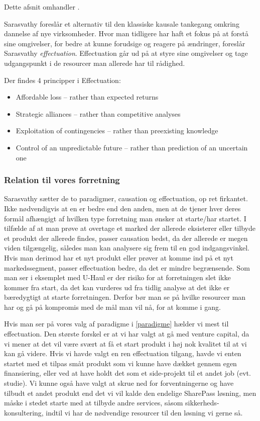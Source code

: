 
Dette afsnit omhandler \citet{sarasvathy2001effectuation}.

Sarasvathy foreslår et alternativ til den klassiske kausale tankegang omkring dannelse af nye virksomheder.
Hvor man tidligere har haft et fokus på at forstå sine omgivelser, for bedre at kunne forudsige og reagere på ændringer, foreslår Sarasvathy \textit{effectuation}.
Effectuation går ud på at styre sine omgivelser og tage udgangspunkt i de resourcer man allerede har til rådighed.

Der findes 4 principper i Effectuation:
\begin{itemize}
  \item Affordable loss -- rather than expected returns
  \item Strategic alliances -- rather than competitive analyses
  \item Exploitation of contingencies -- rather than preexisting knowledge
  \item Control of an unpredictable future -- rather than prediction of an uncertain one
\end{itemize}

\subsubsection{Relation til vores forretning}
Sarasvathy sætter de to paradigmer, causation og effectuation, op ret firkantet.
Ikke nødvendigvis at en er bedre end den anden, men at de tjener hver deres formål afhængigt af hvilken type forretning man ønsker at starte/har startet.
I tilfælde af at man prøve at overtage et marked der allerede eksisterer eller tilbyde et produkt der allerede findes, passer causation bedst, da der allerede er megen viden tilgængelig, således man kan analysere sig frem til en god indgangsvinkel.
Hvis man derimod har et nyt produkt eller prøver at komme ind på et nyt markedssegment, passer effectuation bedre, da det er mindre begrænsende.
Som man ser i eksemplet med U-Haul er der risiko for at forretningen slet ikke kommer fra start, da det kan vurderes ud fra tidlig analyse at det ikke er bæredygtigt at starte forretningen.
Derfor bør man se på hvilke resourcer man har og gå på kompromis med de mål man vil nå, for at komme i gang.

Hvis man ser på vores valg af paradigme i \cref{paradigme} hælder vi mest til effectuation.
Den største forskel er at vi har valgt at gå med venture capital, da vi mener at det vil være svært at få et start produkt i høj nok kvalitet til at vi kan gå videre.
Hvis vi havde valgt en ren effectuation tilgang, havde vi enten startet med et tilpas småt produkt som vi kunne have dækket gennem egen finansiering, eller ved at have holdt det som et side-projekt til et andet job (evt. studie).
Vi kunne også have valgt at skrue ned for forventningerne og have tilbudt et andet produkt end det vi vil kalde den endelige SharePass løsning, men måske i stedet starte med at tilbyde andre services, såsom sikkerheds-konsultering, indtil vi har de nødvendige resourcer til den løsning vi gerne så.
